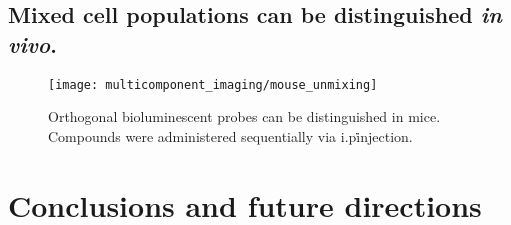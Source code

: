 \subsection{Mixed cell populations can be distinguished \textit{in vivo}.}
\begin{figure}[htb]
\texttt{[image: multicomponent\_imaging/mouse\_unmixing]}
\centering
\caption[Orthogonal bioluminescent probes can be distinguished in mice]{
Orthogonal bioluminescent probes can be distinguished in mice.
Compounds were administered sequentially via i.p\. injection.
}
  \label{fig:mouse_unmixing}
\end{figure}

\section{Conclusions and future directions}





